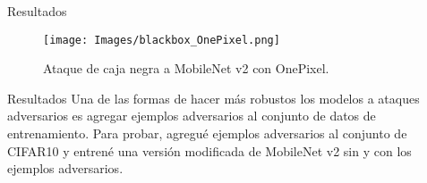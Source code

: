 \documentclass[10pt]{beamer}
\begin{document}
\begin{frame}{Resultados}
\justify	
\small

\begin{figure}[H]
\centering
\texttt{[image: Images/blackbox\_OnePixel.png]}
\caption{Ataque de caja negra a MobileNet v2 con OnePixel.}
\end{figure}

\end{frame}

\begin{frame}{Resultados}
\justify	
\small
Una de las formas de hacer más robustos los modelos a ataques adversarios es agregar ejemplos adversarios al conjunto de datos de entrenamiento. Para probar, agregué ejemplos adversarios al conjunto de CIFAR10 y entrené una versión modificada de MobileNet v2 sin y con los ejemplos adversarios.

\begin{table}[H]
\centering
{}
\caption{Entrenamiento sin y con ejemplos adversarios en CIFAR10 con una versión modificada de MobileNet v2.}
\end{table}


\end{frame}
\end{document}
